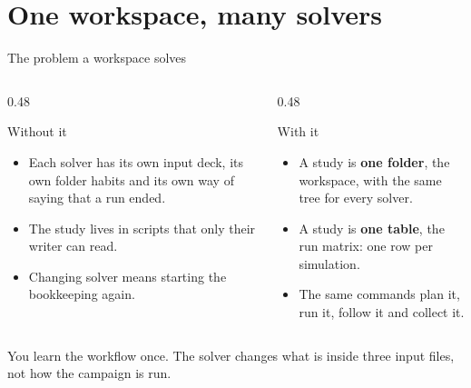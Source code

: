 %
%

\section{One workspace, many solvers}

\begin{frame}{The problem a workspace solves}
\begin{columns}[T]
\begin{column}{0.48\textwidth}
\begin{block}{Without it}
\begin{itemize}\small
  \item Each solver has its own input deck, its own folder habits and its
        own way of saying that a run ended.
  \item The study lives in scripts that only their writer can read.
  \item Changing solver means starting the bookkeeping again.
\end{itemize}
\end{block}
\end{column}
\begin{column}{0.48\textwidth}
\begin{block}{With it}
\begin{itemize}\small
  \item A study is \textbf{one folder}, the workspace, with the same tree
        for every solver.
  \item A study is \textbf{one table}, the run matrix: one row per
        simulation.
  \item The same commands plan it, run it, follow it and collect it.
\end{itemize}
\end{block}
\end{column}
\end{columns}
\begin{takeaway}You learn the workflow once. The solver changes what is
inside three input files, not how the campaign is run.\end{takeaway}
\end{frame}

